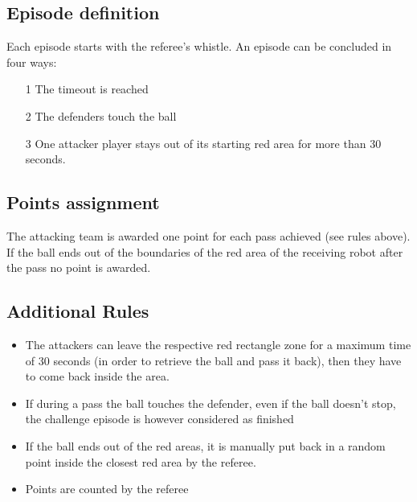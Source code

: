 \subsection{Episode definition}
Each episode starts with the referee's whistle. An episode can be concluded in four ways: 
\begin{itemize}
    \item[1] The timeout is reached
    \item[2] The defenders touch the ball
    \item[3] One attacker player stays out of its starting red area for more than 30 seconds.

\end{itemize}

\subsection{Points assignment}
The attacking team is awarded one point for each pass achieved (see rules above). If the ball ends out of the boundaries of the red area of the receiving robot after the pass no point is awarded.  

\subsection{Additional Rules}
\begin{itemize}
    \item The attackers can leave the respective red rectangle zone for a maximum time of 30 seconds (in order to retrieve the ball and pass it back), then they have to come back inside the area.
    \item If during a pass the ball touches the defender, even if the ball doesn't stop, the challenge episode is however considered as finished
    \item If the ball ends out of the red areas, it is manually put back in a random point inside the closest red area by the referee.
    \item Points are counted by the referee
    
\end{itemize}
